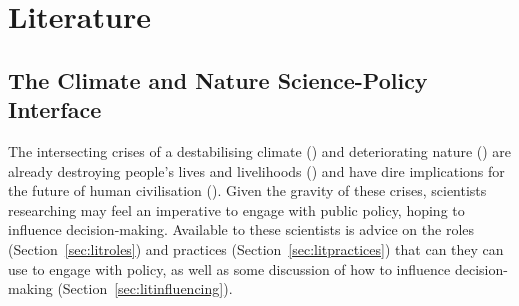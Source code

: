 \chapter{Literature}\label{ch:lit}

\section{The Climate and Nature Science-Policy Interface}\label{sec:litspi}

The intersecting crises of a destabilising climate (\cite{IIPCC2022}) and deteriorating nature (\cite{IPBES2022}) are already destroying people's lives and livelihoods (\cite{TschakertEAKO2019,SpaiserEtAl2024}) and have dire implications for the future of human civilisation (\cite{McKayEtAl2022,WEF2024,SpaiserEtAl2024}). Given the gravity of these crises, scientists researching \CAN{} may feel an imperative to engage with public policy, hoping to influence decision-making. Available to these scientists is advice on the roles (Section~\ref{sec:litroles}) and practices (Section~\ref{sec:litpractices}) that can they can use to engage with policy, as well as some discussion of how to influence decision-making (Section~\ref{sec:litinfluencing}). %

